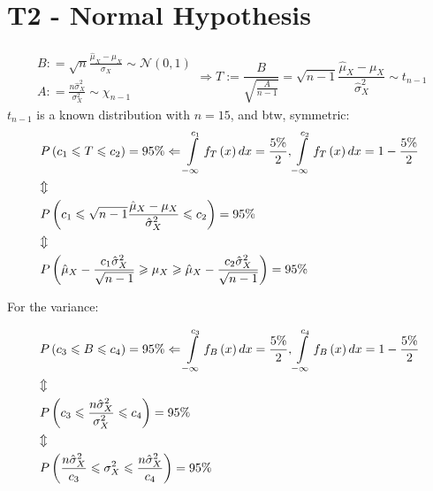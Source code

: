 \documentclass{article}
\begin{document}
\section{T2 - Normal Hypothesis}
\[\begin{array}{*{20}{c}}
        {B: = \sqrt n \frac{{{{\hat \mu }_X} - {\mu _X}}}{\sigma_X }\sim\mathcal{N}\left( {0,1} \right)} \\
        {A: = \frac{{n\hat \sigma _X^2}}{{{\sigma_X ^2}}}\sim{\chi _{n - 1}}}
    \end{array} \Rightarrow T:=\frac{B}{{\sqrt {\frac{A}{{n - 1}}} }} = \sqrt {n - 1} \frac{{{{\hat \mu }_X} - {\mu _X}}}{{\hat \sigma _X^2}}\sim{t_{n - 1}}\]
$t_{n - 1}$ is a known distribution with $n=15$, and btw, symmetric:
\[\begin{gathered}
        P\left( {{c_1} \leqslant T \leqslant {c_2}} \right) = 95\%  \Leftarrow \int\limits_{ - \infty }^{{c_1}} {{f_T}\left( x \right)dx}  = \frac{{5\% }}{2},\int\limits_{ - \infty }^{{c_2}} {{f_T}\left( x \right)dx}  = 1 - \frac{{5\% }}{2} \hfill \\
        \Updownarrow  \hfill \\
        P\left( {{c_1} \leqslant \sqrt {n - 1} \frac{{{{\hat \mu }_X} - {\mu _X}}}{{\hat \sigma _X^2}} \leqslant {c_2}} \right) = 95\%  \hfill \\
        \Updownarrow  \hfill \\
        P\left( {{{\hat \mu }_X} - \frac{{{c_1}\hat \sigma _X^2}}{{\sqrt {n - 1} }} \geqslant {\mu _X} \geqslant {{\hat \mu }_X} - \frac{{{c_2}\hat \sigma _X^2}}{{\sqrt {n - 1} }}} \right) = 95\%  \hfill \\
    \end{gathered} \]

For the variance:

\[\begin{gathered}
        P\left( {{c_3} \leqslant B \leqslant {c_4}} \right) = 95\%  \Leftarrow \int\limits_{ - \infty }^{{c_3}} {{f_B}\left( x \right)dx}  = \frac{{5\% }}{2},\int\limits_{ - \infty }^{{c_4}} {{f_B}\left( x \right)dx}  = 1 - \frac{{5\% }}{2} \hfill \\
        \Updownarrow  \hfill \\
        P\left( {{c_3} \leqslant \frac{{n\hat \sigma _X^2}}{{\sigma _X^2}} \leqslant {c_4}} \right) = 95\%  \hfill \\
        \Updownarrow  \hfill \\
        P\left( {\frac{{n\hat \sigma _X^2}}{{{c_3}}} \leqslant \sigma _X^2 \leqslant \frac{{n\hat \sigma _X^2}}{{{c_4}}}} \right) = 95\%  \hfill \\
    \end{gathered} \]
\end{document}
